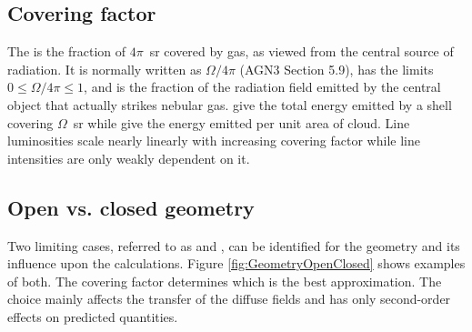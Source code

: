 \subsection{Covering factor}

The  is the fraction of $4\pi$~sr
covered by gas, as viewed
from the central source of radiation.
It is normally written as $\Omega/4\pi$ (AGN3 Section 5.9),
has the limits $0\le\Omega /4\pi\le 1$,
and is the fraction of the
radiation field emitted by the central object
that actually strikes nebular gas.
 give the total energy emitted by
a shell covering
$\Omega$~sr while  give
the energy emitted per unit area of cloud.
Line luminosities scale nearly linearly with increasing covering factor
while line intensities are only weakly dependent on it.

\subsection{Open vs. closed geometry}

Two limiting cases, referred to as  and , can be identified
for the geometry and its influence upon the calculations.
Figure \ref{fig:GeometryOpenClosed} shows
examples of both.
The covering factor determines which is the best
approximation.
The choice mainly affects the transfer of the diffuse fields
and has only second-order effects on predicted quantities.


